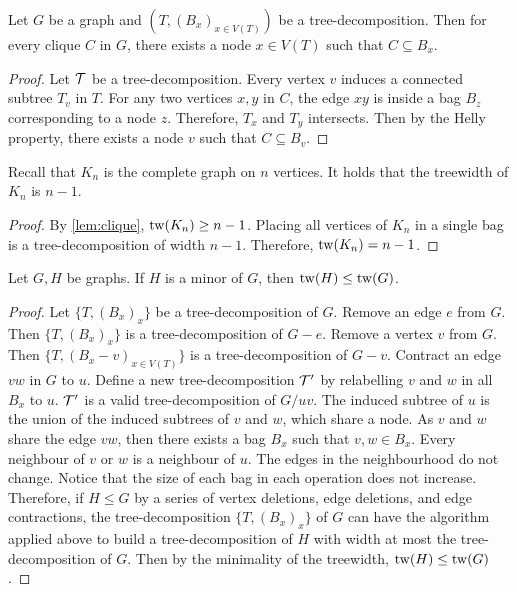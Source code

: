 \begin{proposition}\label{lem:clique}
	Let $G$ be a graph and $(T, (B_x)_{x \in V(T)})$ be a tree-decomposition. Then for every clique \(C\) in \(G\), there exists a node \(x \in V(T)\) such that \(C \subseteq B_x\).
\end{proposition}

\begin{proof}
	Let \(\mathcal{T}\) be a tree-decomposition. Every vertex \(v\) induces a connected subtree \(T_v\) in \(T\). For any two vertices \(x, y\) in \(C\), the edge \(xy\) is inside a bag \(B_z\) corresponding to a node \(z\). Therefore, \(T_x\) and \(T_y\) intersects. Then by the Helly property, there exists a node \(v\) such that \(C \subseteq B_v\).
\end{proof}

\begin{corollary}\label{cor:complete_tw}
	Recall that $K_n$ is the complete graph on $n$ vertices. It holds that the treewidth of $K_n$ is $n-1$. 
\end{corollary}
\begin{proof}
	By \cref{lem:clique}, $\operatorname{tw}(K_n)\geq n-1$. Placing all vertices of $K_n$ in a single bag is a tree-decomposition of width $n-1$. Therefore, $\operatorname{tw}(K_n) = n-1$. 
\end{proof}

\begin{proposition}\label{thm:tw_minor_closure}
	Let $G, H$ be graphs. If \(H\) is a minor of \(G\), then \(\operatorname{tw}(H) \leq \operatorname{tw}(G)\).
\end{proposition}
\begin{proof}
	Let \( \{T, {(B_x)}_{x} \} \) be a tree-decomposition of \(G\). Remove an edge $e$ from $G$. Then \( \{T, {(B_x)}_{x} \} \) is a tree-decomposition of $G - e$. Remove a vertex $v$ from $G$. Then \( \{ T, {(B_x - v)}_{x \in V(T)} \} \) is a tree-decomposition of $G - v$. Contract an edge $vw$ in $G$ to $u$. Define a new tree-decomposition $\mathcal{T}'$ by relabelling \(v\) and \(w\) in all $B_x$ to \(u\). $\mathcal{T}'$ is a valid tree-decomposition of $G / uv$. The induced subtree of \(u\) is the union of the induced subtrees of \(v\) and \(w\), which share a node. As $v$ and $w$ share the edge $vw$, then there exists a bag $B_x$ such that $v, w \in B_x$. Every neighbour of \(v\) or \(w\) is a neighbour of \(u\). The edges in the neighbourhood do not change. Notice that the size of each bag in each operation does not increase. Therefore, if $H \leq G$ by a series of vertex deletions, edge deletions, and edge contractions, the tree-decomposition \( \{T, {(B_x)}_{x} \} \) of $G$ can have the algorithm applied above to build a tree-decomposition of $H$ with width at most the tree-decomposition of $G$. Then by the minimality of the treewidth, \(\operatorname{tw}(H) \leq \operatorname{tw}(G)\). 
\end{proof}

